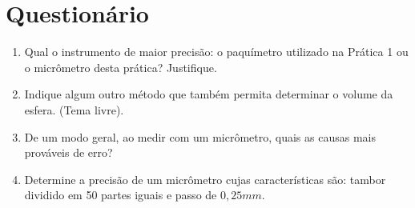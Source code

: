 \documentclass[10pt,a4paper,onecolumn,notitlepage]{scrartcl}
\begin{document}
\section{Questionário}
\begin{enumerate}
\item Qual  o  instrumento  de  maior  precisão:  o  paquímetro utilizado na Prática 1 ou  o  micrômetro desta prática?  Justifique.
\item Indique  algum  outro  método  que  também  permita  determinar  o  volume  da  esfera.  (Tema  livre).
\item De um modo geral, ao medir com um micrômetro,  quais  as  causas  mais  prováveis  de  erro?
\item Determine  a  precisão  de  um  micrômetro  cujas  características  são:  tambor  dividido  em  50  partes  iguais  e  passo  de  $0,25mm$.
\end{enumerate}
\end{document}
